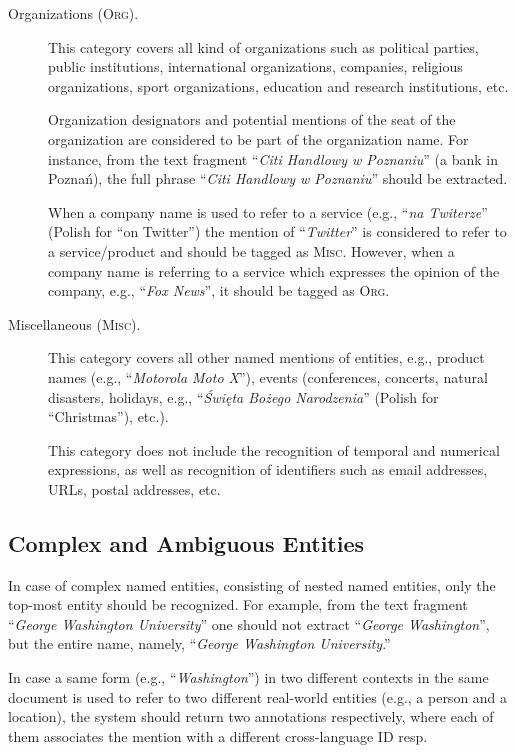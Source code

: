 \documentclass[11pt]{article}
\begin{document}
\begin{description}
\item[Organizations (\textsc{Org}).]

This category covers all kind of organizations such as political parties,
public institutions, international organizations, companies, religious
organizations, sport organizations, education and research institutions, etc.

Organization designators and potential mentions of the seat of the organization
are considered to be part of the organization name. For instance, from the text
fragment ``\textit{Citi Handlowy w Poznaniu}'' (a bank in Poznań), the full
phrase ``\textit{Citi Handlowy w Poznaniu}'' should be extracted.
			
When a company name is used to refer to a service (e.g., ``\textit{na
Twiterze}'' (Polish for ``on Twitter'') the mention of ``\textit{Twitter}'' is
considered to refer to a service/product and should be tagged as \textsc{Misc}.
However, when a company name is referring to a service which expresses the
opinion of the company, e.g., ``\textit{Fox News}'', it should be tagged as
\textsc{Org}.			

\item[Miscellaneous (\textsc{Misc}).]

This category covers all other named mentions of entities, e.g., product names
(e.g., ``\textit{Motorola Moto X}''), events (conferences, concerts, natural
disasters, holidays, e.g., ``\textit{Święta Bożego Narodzenia}'' (Polish for ``Christmas''), etc.).

This category does not include the recognition of temporal and numerical
expressions, as well as recognition of identifiers such as email addresses,
URLs, postal addresses, etc.

\end{description}

\subsection{Complex and Ambiguous Entities}

In case of complex named entities, consisting of nested named entities, only
the top-most entity should be recognized. For example, from the text fragment
``\textit{George Washington University}'' one should not extract
``\textit{George Washington}'', but the entire name, namely, ``\textit{George
Washington University}.''

In case a same form (e.g., ``\textit{Washington}'') in two different contexts
in the same document is used to refer to two different real-world entities
(e.g., a person and a location), the system should return two annotations
respectively, where each of them associates the mention with a different
cross-language ID resp.
\end{document}
